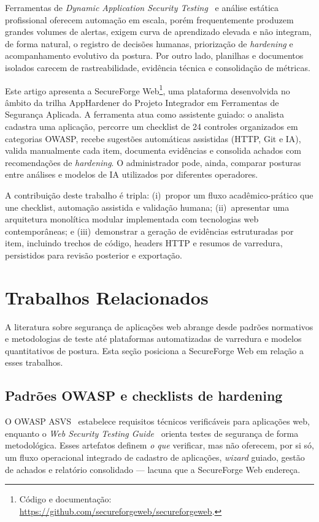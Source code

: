 \documentclass[12pt]{article}
\begin{document}
Ferramentas de \emph{Dynamic Application Security Testing}~\cite{owasp-dast} e análise estática profissional oferecem automação em escala, porém frequentemente produzem grandes volumes de alertas, exigem curva de aprendizado elevada e não integram, de forma natural, o registro de decisões humanas, priorização de \emph{hardening} e acompanhamento evolutivo da postura. Por outro lado, planilhas e documentos isolados carecem de rastreabilidade, evidência técnica e consolidação de métricas.

Este artigo apresenta a SecureForge Web\footnote{Código e documentação: \url{https://github.com/secureforgeweb/secureforgeweb}.}, uma plataforma desenvolvida no âmbito da trilha AppHardener do Projeto Integrador em Ferramentas de Segurança Aplicada. A ferramenta atua como assistente guiado: o analista cadastra uma aplicação, percorre um checklist de 24 controles organizados em categorias OWASP, recebe sugestões automáticas assistidas (HTTP, Git e IA), valida manualmente cada item, documenta evidências e consolida achados com recomendações de \emph{hardening}. O administrador pode, ainda, comparar posturas entre análises e modelos de IA utilizados por diferentes operadores.

A contribuição deste trabalho é tripla: (i)~propor um fluxo acadêmico-prático que une checklist, automação assistida e validação humana; (ii)~apresentar uma arquitetura monolítica modular implementada com tecnologias web contemporâneas; e (iii)~demonstrar a geração de evidências estruturadas por item, incluindo trechos de código, headers HTTP e resumos de varredura, persistidos para revisão posterior e exportação.

\section{Trabalhos Relacionados}
A literatura sobre segurança de aplicações web abrange desde padrões normativos e metodologias de teste até plataformas automatizadas de varredura e modelos quantitativos de postura. Esta seção posiciona a SecureForge Web em relação a esses trabalhos.

\subsection{Padrões OWASP e checklists de hardening}
O OWASP ASVS~\cite{owasp-asvs-2025} estabelece requisitos técnicos verificáveis para aplicações web, enquanto o \emph{Web Security Testing Guide}~\cite{owasp-wstg} orienta testes de segurança de forma metodológica. Esses artefatos definem \emph{o que} verificar, mas não oferecem, por si só, um fluxo operacional integrado de cadastro de aplicações, \emph{wizard} guiado, gestão de achados e relatório consolidado --- lacuna que a SecureForge Web endereça.
\end{document}

